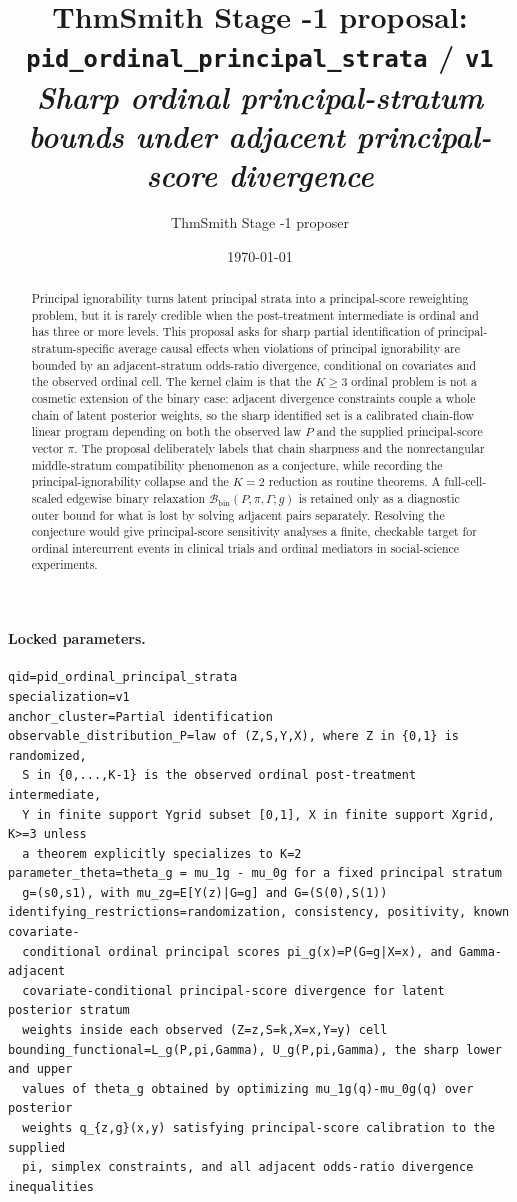 \documentclass[11pt]{article}
\title{ThmSmith Stage -1 proposal: \texttt{pid\_ordinal\_principal\_strata} / \texttt{v1}%
  \\ \large\textit{Sharp ordinal principal-stratum bounds under adjacent principal-score divergence}}
\author{ThmSmith Stage -1 proposer}
\date{\today}
\theoremstyle{definition}
\theoremstyle{plain}
\theoremstyle{remark}
\begin{document}
\maketitle


\paragraph{Locked parameters.}
\begin{verbatim}
qid=pid_ordinal_principal_strata
specialization=v1
anchor_cluster=Partial identification
observable_distribution_P=law of (Z,S,Y,X), where Z in {0,1} is randomized,
  S in {0,...,K-1} is the observed ordinal post-treatment intermediate,
  Y in finite support Ygrid subset [0,1], X in finite support Xgrid, K>=3 unless
  a theorem explicitly specializes to K=2
parameter_theta=theta_g = mu_1g - mu_0g for a fixed principal stratum
  g=(s0,s1), with mu_zg=E[Y(z)|G=g] and G=(S(0),S(1))
identifying_restrictions=randomization, consistency, positivity, known covariate-
  conditional ordinal principal scores pi_g(x)=P(G=g|X=x), and Gamma-adjacent
  covariate-conditional principal-score divergence for latent posterior stratum
  weights inside each observed (Z=z,S=k,X=x,Y=y) cell
bounding_functional=L_g(P,pi,Gamma), U_g(P,pi,Gamma), the sharp lower and upper
  values of theta_g obtained by optimizing mu_1g(q)-mu_0g(q) over posterior
  weights q_{z,g}(x,y) satisfying principal-score calibration to the supplied
  pi, simplex constraints, and all adjacent odds-ratio divergence inequalities
\end{verbatim}

\begin{abstract}
Principal ignorability turns latent principal strata into a principal-score reweighting problem, but it is rarely credible when the post-treatment intermediate is ordinal and has three or more levels.  This proposal asks for sharp partial identification of principal-stratum-specific average causal effects when violations of principal ignorability are bounded by an adjacent-stratum odds-ratio divergence, conditional on covariates and the observed ordinal cell.  The kernel claim is that the \(K\ge 3\) ordinal problem is not a cosmetic extension of the binary case: adjacent divergence constraints couple a whole chain of latent posterior weights, so the sharp identified set is a calibrated chain-flow linear program depending on both the observed law \(P\) and the supplied principal-score vector \(\pi\).  The proposal deliberately labels that chain sharpness and the nonrectangular middle-stratum compatibility phenomenon as a conjecture, while recording the principal-ignorability collapse and the \(K=2\) reduction as routine theorems.  A full-cell-scaled edgewise binary relaxation \(\mathcal B_{\mathrm{bin}}(P,\pi,\Gamma;g)\) is retained only as a diagnostic outer bound for what is lost by solving adjacent pairs separately.  Resolving the conjecture would give principal-score sensitivity analyses a finite, checkable target for ordinal intercurrent events in clinical trials and ordinal mediators in social-science experiments.
\end{abstract}
\end{document}
